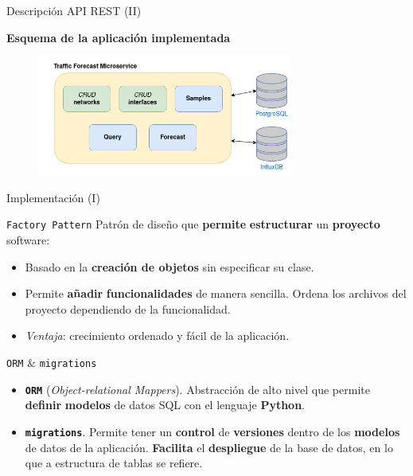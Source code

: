 \documentclass[aspectratio=169,xcolor=dvipsnames]{beamer}
\begin{document}
	
	\begin{frame}{Descripción API REST (II)}
		
		\textbf{Esquema de la aplicación implementada}
		
		\begin{figure}[h!]
			\begin{center}
				\includegraphics[width=0.75\textwidth]{diag/traffic_forecast_schema.png}
			\end{center}
		\end{figure}
	\end{frame}
	
	
	\begin{frame}{Implementación (I)}
		\begin{exampleblock}{\texttt{Factory Pattern}}
			Patrón de diseño que \textbf{permite} \textbf{estructurar} un \textbf{proyecto} software:
			\begin{itemize}
				\item Basado en la \textbf{creación de objetos} sin especificar su clase.
				\item Permite \textbf{añadir} \textbf{funcionalidades} de manera sencilla. Ordena los archivos del proyecto dependiendo de la funcionalidad.
				\item \textit{Ventaja}: crecimiento ordenado y fácil de la aplicación.
			\end{itemize}
		\end{exampleblock}
	
		\begin{alertblock}{\texttt{ORM} \& \texttt{migrations}}
			\begin{itemize}
				\item \texttt{\textbf{ORM}} (\textit{Object-relational Mappers}). Abstracción de alto nivel que permite \textbf{definir} \textbf{modelos} de datos SQL con el lenguaje \textbf{Python}.
				
				\item \texttt{\textbf{migrations}}. Permite tener un \textbf{control} de \textbf{versiones} dentro de los \textbf{modelos} de datos de la aplicación. \textbf{Facilita} el \textbf{despliegue} de la base de datos, en lo que a estructura de tablas se refiere.	
		\end{itemize}
		\end{alertblock}
		
	\end{frame}
\end{document}

